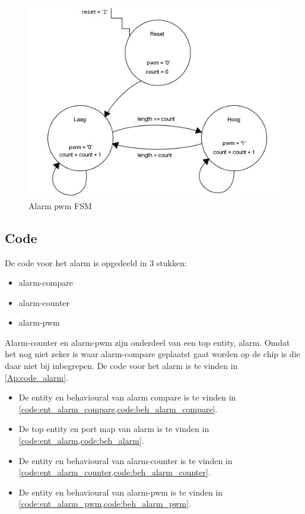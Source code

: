 \begin{figure}
\includegraphics[width=\textwidth,height=\textheight,keepaspectratio]{Figuren/Alarm/FSM_PWM.jpg}
\caption{Alarm pwm FSM}
\end{figure}
\newpage
\subsection{Code}
De code voor het alarm is opgedeeld in 3 stukken:
\begin{itemize}[nolistsep]
\item alarm-compare
\item alarm-counter
\item alarm-pwm
\end{itemize}
Alarm-counter en alarm-pwm zijn onderdeel van een top entity, alarm. Omdat het nog niet zeker is waar alarm-compare geplaatst gaat worden op de chip is die daar niet bij inbegrepen.
De code voor het alarm is te vinden in \cref{Ap:code_alarm}.
\begin{itemize}[nolistsep]
\item De entity en behavioural van alarm compare is te vinden in \cref{code:ent_alarm_compare,code:beh_alarm_compare}.
\item De top entity en port map van alarm is te vinden in \cref{code:ent_alarm,code:beh_alarm}.
\item De entity en behavioural van alarm-counter is te vinden in \cref{code:ent_alarm_counter,code:beh_alarm_counter}.
\item De entity en behavioural van alarm-pwm is te vinden in \cref{code:ent_alarm_pwm,code:beh_alarm_pwm}.
\end{itemize}
\newpage
